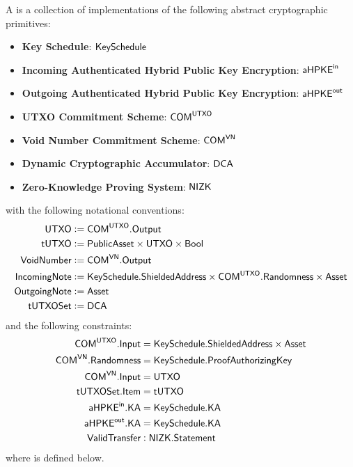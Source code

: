 \begin{definition}
    A \TransferConfiguration{} is a collection of implementations of the following abstract cryptographic primitives:
    \begin{itemize}
        \item \textbf{Key Schedule}: ${\textsf{KeySchedule}}$
        \item \textbf{Incoming Authenticated Hybrid Public Key Encryption}: ${{\textsf{aHPKE}}^\textsf{in}}$
        \item \textbf{Outgoing Authenticated Hybrid Public Key Encryption}: ${{\textsf{aHPKE}}^\textsf{out}}$
        \item \textbf{UTXO Commitment Scheme}: ${\textsf{COM}}^{{\textsf{UTXO}}}$
        \item \textbf{Void Number Commitment Scheme}: ${\textsf{COM}}^{{\textsf{VN}}}$
        \item \textbf{Dynamic Cryptographic Accumulator}: ${\textsf{DCA}}$
        \item \textbf{Zero-Knowledge Proving System}: ${\textsf{NIZK}}$
    \end{itemize}
    with the following notational conventions:
    \begin{align*}
        {\textsf{UTXO}}         &:= {\textsf{COM}}^{{\textsf{UTXO}}}.{\textsf{Output}} \\
        {\textsf{tUTXO}}        &:= {\textsf{PublicAsset}} \times {\textsf{UTXO}} \times {\textsf{Bool}} \\
        {\textsf{VoidNumber}}   &:= {\textsf{COM}}^{{\textsf{VN}}}.{\textsf{Output}} \\
        {\textsf{IncomingNote}} &:= {\textsf{KeySchedule}}.{\textsf{ShieldedAddress}} \times {\textsf{COM}}^{\textsf{UTXO}}.{\textsf{Randomness}} \times {\textsf{Asset}} \\
        {\textsf{OutgoingNote}} &:= {\textsf{Asset}} \\
        {\textsf{tUTXOSet}}     &:= {\textsf{DCA}}
    \end{align*}
    and the following constraints:
    \begin{align*}
        {\textsf{COM}}^{{\textsf{UTXO}}}.{\textsf{Input}}    &= {\textsf{KeySchedule}}.{\textsf{ShieldedAddress}} \times {\textsf{Asset}} \\
        {\textsf{COM}}^{{\textsf{VN}}}.{\textsf{Randomness}} &= {\textsf{KeySchedule}}.{\textsf{ProofAuthorizingKey}} \\
        {\textsf{COM}}^{{\textsf{VN}}}.{\textsf{Input}}      &= {\textsf{UTXO}} \\
        {\textsf{tUTXOSet}}.{\textsf{Item}}        &= {\textsf{tUTXO}} \\
        {{\textsf{aHPKE}}^\textsf{in}}.{\textsf{KA}}           &= {\textsf{KeySchedule}}.{\textsf{KA}} \\
        {{\textsf{aHPKE}}^\textsf{out}}.{\textsf{KA}}          &= {\textsf{KeySchedule}}.{\textsf{KA}} \\
        {\textsf{ValidTransfer}}         &: {\textsf{NIZK}}.{\textsf{Statement}} \\
    \end{align*}
    where \ValidTransfer{} is defined below.
\end{definition}

